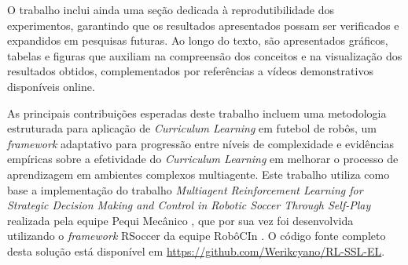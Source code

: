 O trabalho inclui ainda uma seção dedicada à reprodutibilidade dos experimentos, garantindo que os resultados apresentados possam ser verificados e expandidos em pesquisas futuras. Ao longo do texto, são apresentados gráficos, tabelas e figuras que auxiliam na compreensão dos conceitos e na visualização dos resultados obtidos, complementados por referências a vídeos demonstrativos disponíveis online.

As principais contribuições esperadas deste trabalho incluem uma metodologia estruturada para aplicação de \textit{Curriculum Learning} em futebol de robôs, um \textit{framework} adaptativo para progressão entre níveis de complexidade e evidências empíricas sobre a efetividade do \textit{Curriculum Learning} em melhorar o processo de aprendizagem em ambientes complexos multiagente. Este trabalho utiliza como base a implementação \cite{framework_pequi_rSoccer} do trabalho \textit{Multiagent Reinforcement Learning for Strategic Decision Making and Control in Robotic Soccer Through Self-Play} \cite{bruno_brandao} realizada pela equipe Pequi Mecânico \cite{pequi_mecanico}, que por sua vez foi desenvolvida utilizando o \textit{framework} RSoccer \cite{rSoccer} da equipe RobôCIn \cite{robocin}. O código fonte completo desta solução está disponível em \url{https://github.com/Werikcyano/RL-SSL-EL}.
